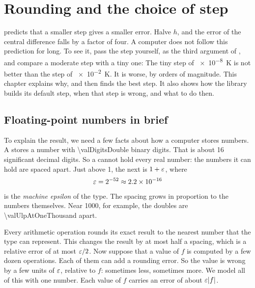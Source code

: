 \chapter{Rounding and the choice of step}\label{ch:rounding}

 predicts that a smaller step gives a smaller error. Halve $h$, and the error of the central
difference falls by a factor of four. A computer does not follow this prediction for long. To see it, pass the step
yourself, as the third argument of , and compare a moderate step with a tiny one:
The tiny step of \SI{e-8}{\kelvin} is not better than the step of \SI{e-2}{\kelvin}. It is worse, by orders of
magnitude. This chapter explains why, and then finds the best step. It also shows how the library builds its default
step, when that step is wrong, and what to do then.

\section{Floating-point numbers in brief}\label{sec:rounding-fp}

To explain the result, we need a few facts about how a computer stores numbers. A  stores a number with
\num{\valDigitsDouble} binary digits. That is about 16 significant decimal digits. So a  cannot hold
every real number: the numbers it can hold are spaced apart. Just above 1, the next  is $1 + \varepsilon$,
where
\begin{equation*}
  \varepsilon = 2^{-52} \approx \num{2.2e-16}
\end{equation*}
is the \emph{machine epsilon} of the type. The spacing grows
in proportion to the numbers themselves. Near \num{1000}, for example, the doubles are \num{\valUlpAtOneThousand}
apart.

Every arithmetic operation rounds its exact result to the nearest number that the type can represent. This changes
the result by at most half a spacing, which is a relative error of at most
$\varepsilon / 2$.\cite{higham2002,goldberg1991} Now suppose that a value of $f$ is computed by a few dozen operations. Each of them
can add a rounding error. So the value is wrong by a few units of $\varepsilon$, relative to $f$: sometimes less,
sometimes more. We model all of this with one number. Each value of $f$ carries an error of about
$\varepsilon \lvert f \rvert$.

